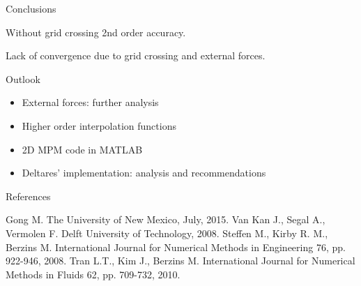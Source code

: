 \documentclass[mathserif,professionalfont,hyperref={pdfpagelabels=false}]{beamer}
\begin{document}
\begin{frame}{Conclusions}
\begin{tcolorbox}[colback=blue!5,colframe=blue!40!black,title=Vibrating bar]
Without grid crossing 2nd order accuracy.
\end{tcolorbox}

\begin{tcolorbox}[colback=blue!5,colframe=blue!40!black,title=Oedometer]
Lack of convergence due to grid crossing and external forces.
\end{tcolorbox}
\end{frame}

\begin{frame}{Outlook}
\begin{itemize}
\item External forces: further analysis 
\pause
\item Higher order interpolation functions
\pause
\item 2D MPM code in MATLAB
\pause
\item Deltares' implementation: analysis and recommendations
\end{itemize}
\end{frame}



\begin{frame}{References}
\begin{thebibliography}{22}
  Gong M.
 \newblock The University of New Mexico, July, 2015.
  Van Kan J., Segal A., Vermolen F. 
 \newblock Delft University of Technology, 2008.
  Steffen M., Kirby R. M., Berzins M. 
 \newblock International Journal for Numerical Methods in Engineering 76, pp. 922-946, 2008.
  Tran L.T., Kim J., Berzins M. 
 \newblock International Journal for Numerical Methods in Fluids 62, pp. 709-732, 2010.
\end{thebibliography}
\end{frame}
\end{document}
